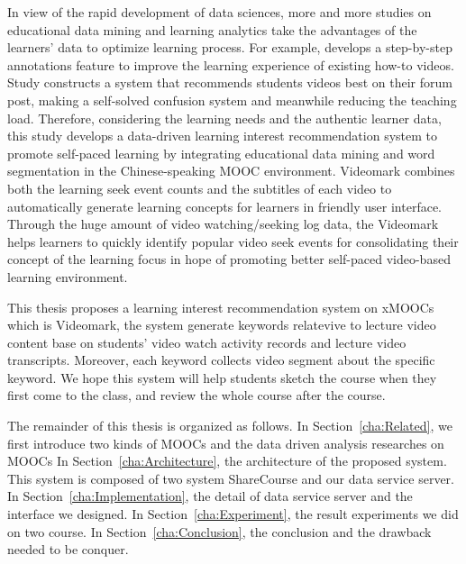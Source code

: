 In view of the rapid development of data sciences,
more and more studies on educational data mining and learning analytics take the advantages of the learners’ data to optimize learning process.
For example, \cite{kim2014} develops a step-by-step annotations feature to improve the learning experience of existing how-to videos.
Study \cite{agrawal2015} constructs a system that recommends students videos best on their forum post, making a self-solved confusion system and meanwhile reducing the teaching load.
Therefore, considering the learning needs and the authentic learner data,
this study develops a data-driven learning interest recommendation system to promote self-paced learning by integrating educational data mining and word segmentation in the Chinese-speaking MOOC environment.
Videomark combines both the learning seek event counts and the subtitles of each video to automatically generate learning concepts for learners in friendly user interface.
Through the huge amount of video watching/seeking log data, the Videomark helps learners to quickly identify popular video seek events for consolidating their concept of the learning focus in hope of promoting better self-paced video-based learning environment.

This thesis proposes a learning interest recommendation system on xMOOCs which is Videomark, the system generate keywords relatevive to lecture video content base on students' video watch activity records and lecture video transcripts.
Moreover, each keyword collects video segment about the specific keyword.
We hope this system will help students sketch the course when they first come to the class,
and review the whole course after the course.

The remainder of this thesis is organized as follows.
In Section~\ref{cha:Related}, we first introduce two kinds of MOOCs and the data driven analysis researches on MOOCs
In Section~\ref{cha:Architecture}, the architecture of the proposed system. This system is composed of two system ShareCourse \cite{sharecourse} and our data service server.
In Section~\ref{cha:Implementation}, the detail of data service server and the interface we designed.
In Section~\ref{cha:Experiment}, the result experiments we did on two course.
In Section~\ref{cha:Conclusion}, the conclusion and the drawback needed to be conquer.

